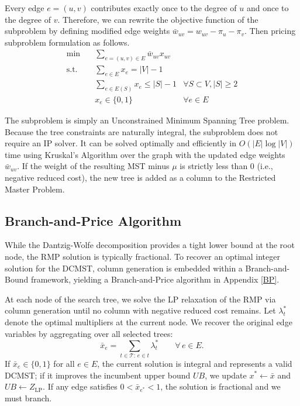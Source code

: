 \documentclass[12pt]{article}
\begin{document}
\noindent Every edge $e = (u,v)$ contributes exactly once to the degree of $u$ and once to the degree of $v$. Therefore, we can rewrite the objective function of the subproblem by defining {modified edge weights}
$\bar{w}_{uv} = w_{uv} - \pi_u - \pi_v$. Then {pricing subproblem formulation as follows.}
\begin{align}
\min \quad & \sum_{e=(u,v) \in E} \bar{w}_{uv} x_{uv} \\
\text{s.t.} \quad & \sum_{e \in E} x_e = |V| - 1 \\
& \sum_{e \in E(S)} x_e \leq |S| - 1 & \forall S \subset V, |S| \geq 2 \\
& x_e \in \{0,1\} & \forall e \in E
\end{align}

\noindent The subproblem is simply an {Unconstrained Minimum Spanning Tree} problem. Because the tree constraints are naturally integral, the subproblem does not require an IP solver. It can be solved optimally and efficiently in $O(|E| \log |V|)$ time using {Kruskal's Algorithm} over the graph with the updated edge weights $\bar{w}_{uv}$. If the weight of the resulting MST minus $\mu$ is strictly less than 0 (i.e., negative reduced cost), the new tree is added as a column to the Restricted Master Problem.

\subsection{Branch-and-Price Algorithm}
\label{sec:bp_impl}
While the Dantzig-Wolfe decomposition provides a tight lower bound at the root node, the RMP solution is typically fractional. To recover an optimal integer solution for the DCMST, column generation is embedded within a Branch-and-Bound framework, yielding a Branch-and-Price algorithm in Appendix \ref{BP}.

\medskip
\noindent 
At each node of the search tree, we solve the LP relaxation of the RMP via column generation until no column with negative reduced cost remains. Let $\lambda_t^*$ denote the optimal multipliers at the current node. We recover the original edge variables by aggregating over all selected trees:
\begin{equation*}
    \bar{x}_e = \sum_{t \in \mathcal{T}:\, e \in t} \lambda_t^* \qquad \forall\, e \in E.
\end{equation*}
If $\bar{x}_e \in \{0,1\}$ for all $e \in E$, the current solution is integral and represents a valid DCMST; if it improves the incumbent upper bound $UB$, we update $x^* \gets \bar{x}$ and $UB \gets Z_{\text{LP}}$. If any edge satisfies $0 < \bar{x}_{e^*} < 1$, the solution is fractional and we must branch.
\end{document}
